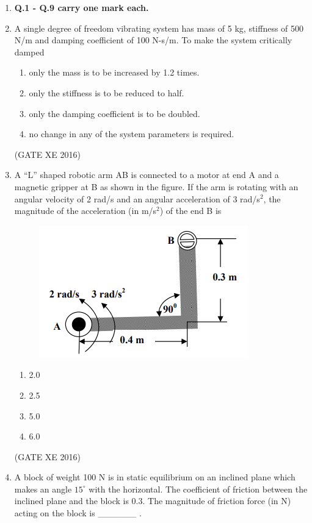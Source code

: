 \documentclass[12pt]{article}
\begin{document}
\begin{enumerate}
\item[] \textbf{Q.1 - Q.9 carry one mark each.}

\item A single degree of freedom vibrating system has mass of 5 kg, stiffness of 500 N/m and damping coefficient of 100 N-s/m. To make the system critically damped  
\begin{enumerate}
\item only the mass is to be increased by 1.2 times.  
\item only the stiffness is to be reduced to half.  
\item only the damping coefficient is to be doubled.  
\item no change in any of the system parameters is required.  
\end{enumerate}
(GATE XE 2016)

\item A ``L'' shaped robotic arm AB is connected to a motor at end A and a magnetic gripper at B as shown in the figure. If the arm is rotating with an angular velocity of 2 rad/s and an angular acceleration of 3 rad/s$^2$, the magnitude of the acceleration (in m/s$^2$) of the end B is  

\begin{figure}[H]
    \centering
    \includegraphics[width=0.5\columnwidth]{figs/ass3_d_q2.png}
    \caption{}
    \label{fig:placeholder}
\end{figure}
\begin{multicols}{4}
\begin{enumerate}
\item 2.0  
\item 2.5  
\item 5.0  
\item 6.0  
\end{enumerate}
\end{multicols}
(GATE XE 2016)

\item A block of weight 100 N is in static equilibrium on an inclined plane which makes an angle $15^\circ$ with the horizontal. The coefficient of friction between the inclined plane and the block is 0.3. The magnitude of friction force (in N) acting on the block is \_\_\_\_\_\_ .  


\end{enumerate}
\end{document}
